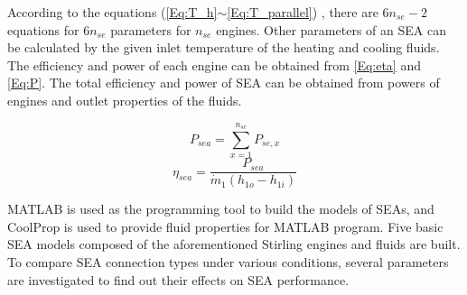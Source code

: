 According to the equations (\autoref{Eq:T_h}$\sim$\autoref{Eq:T_parallel})
, there are $6n_{se} - 2$ equations for $6n_{se}$ parameters for $n_{se}$ engines. Other parameters of an SEA can be calculated by the given inlet temperature of the heating and cooling fluids. The efficiency and power of each engine can be obtained from \autoref{Eq:eta} and \autoref{Eq:P}. The total efficiency and power of SEA can be obtained from powers of engines and outlet properties of the fluids.

\begin{equation}
	P_{sea} = \sum_{x = 1}^{n_{se}}P_{se,x}
\end{equation}
\begin{equation}
	\eta_{sea} = \dfrac{P_{sea}}{\dot{m}_1(h_{1o} - h_{1i})}
\end{equation}                                                                                                                                                                                                                                                                                                                                                                                                                                                        

MATLAB is used as the programming tool to build the models of SEAs, and CoolProp is used to provide fluid properties for MATLAB program. Five basic SEA models composed of the aforementioned Stirling engines and fluids are built. To compare SEA connection types under various conditions, several parameters are investigated to find out their effects on SEA performance.

